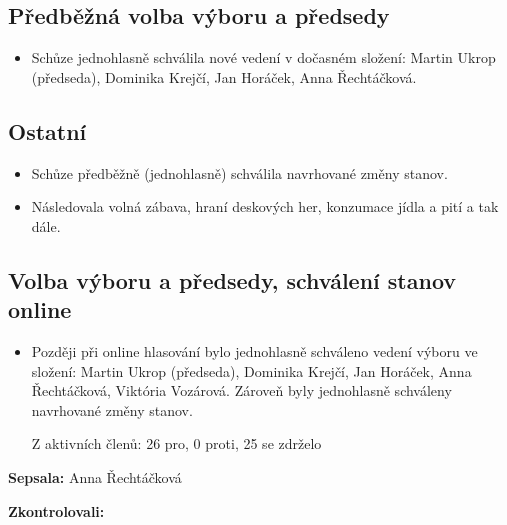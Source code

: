 \documentclass[11pt,a4paper]{article}
\begin{document}
\subsection*{Předběžná volba výboru a předsedy}
\begin{itemize}[itemsep=0pt]
\item Schůze jednohlasně schválila nové vedení v dočasném složení: Martin Ukrop (předseda), Dominika Krejčí, Jan Horáček, Anna Řechtáčková.
\end{itemize}

\subsection*{Ostatní}
\begin{itemize}[itemsep=0pt]
\item Schůze předběžně (jednohlasně) schválila navrhované změny stanov.
\item Následovala volná zábava, hraní deskových her, konzumace jídla a pití a tak dále.
\end{itemize}

\subsection*{Volba výboru a předsedy, schválení stanov online}
\begin{itemize}[itemsep=0pt]
\item Později při online hlasování bylo jednohlasně schváleno vedení výboru ve složení: Martin Ukrop (předseda), Dominika Krejčí, Jan Horáček, Anna Řechtáčková, Viktória Vozárová. Zároveň byly jednohlasně schváleny navrhované změny stanov.

Z aktivních členů: 26 pro, 0 proti, 25 se zdrželo
\end{itemize}

\textbf{Sepsala:} Anna Řechtáčková

\textbf{Zkontrolovali:} 
\end{document}
